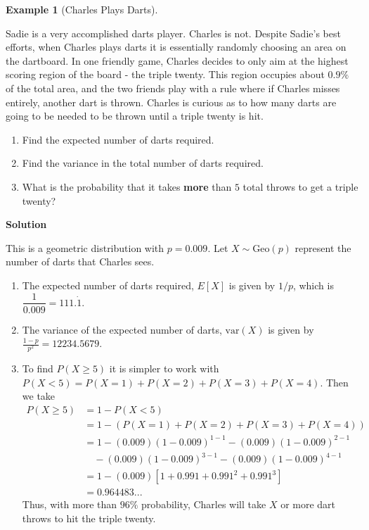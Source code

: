 \documentclass[
  letterpaper,
  DIV=11,
  numbers=noendperiod]{scrreprt}
\providecommand{\tightlist}{%
  \setlength{\itemsep}{0pt}\setlength{\parskip}{0pt}}\usepackage{longtable,booktabs,array}
\theoremstyle{definition}
\theoremstyle{definition}
\newtheorem{example}{Example}[chapter]
\theoremstyle{definition}
\theoremstyle{remark}
\begin{document}
\begin{example}[Charles Plays
Darts]\protect\hypertarget{exm-geometric}{}\label{exm-geometric}

Sadie is a very accomplished darts player. Charles is not. Despite
Sadie's best efforts, when Charles plays darts it is essentially
randomly choosing an area on the dartboard. In one friendly game,
Charles decides to only aim at the highest scoring region of the board -
the triple twenty. This region occupies about \(0.9\%\) of the total
area, and the two friends play with a rule where if Charles misses
entirely, another dart is thrown. Charles is curious as to how many
darts are going to be needed to be thrown until a triple twenty is hit.

\begin{enumerate}
\def\labelenumi{\alph{enumi}.}
\tightlist
\item
  Find the expected number of darts required.
\item
  Find the variance in the total number of darts required.
\item
  What is the probability that it takes \textbf{more} than \(5\) total
  throws to get a triple twenty?
\end{enumerate}

\begin{tcolorbox}[enhanced jigsaw, colback=white, colframe=quarto-callout-color-frame, arc=.35mm, leftrule=.75mm, rightrule=.15mm, opacityback=0, breakable, bottomrule=.15mm, left=2mm, toprule=.15mm]

\vspace{-3mm}\textbf{Solution}\vspace{3mm}

This is a geometric distribution with \(p=0.009\). Let
\(X \sim \text{Geo}(p)\) represent the number of darts that Charles
sees.

\begin{enumerate}
\def\labelenumi{\alph{enumi}.}
\tightlist
\item
  The expected number of darts required, \(E[X]\) is given by \(1/p\),
  which is \(\dfrac{1}{0.009} = 111.\dot1\).
\item
  The variance of the expected number of darts, \(\text{var}(X)\) is
  given by \(\frac{1-p}{p^2} = 12234.5679\).
\item
  To find \(P(X \geq 5)\) it is simpler to work with
  \(P(X < 5) = P(X=1) + P(X=2) + P(X = 3) + P(X=4)\). Then we take
  \begin{align*}
   P(X \geq 5) &= 1 - P(X < 5) \\
   &= 1 - (P(X=1) + P(X=2) + P(X = 3) + P(X=4))\\
   &= 1 - (0.009)(1-0.009)^{1-1} - (0.009)(1-0.009)^{2-1} \\
   &\quad - (0.009)(1-0.009)^{3-1} - (0.009)(1-0.009)^{4-1} \\
   &= 1 - (0.009)[1 + 0.991 + 0.991^2 + 0.991^3] \\
   &= 0.964483...
  \end{align*} Thus, with more than \(96\%\) probability, Charles will
  take \(X\) or more dart throws to hit the triple twenty.
\end{enumerate}


\end{tcolorbox}
\end{example}
\end{document}
